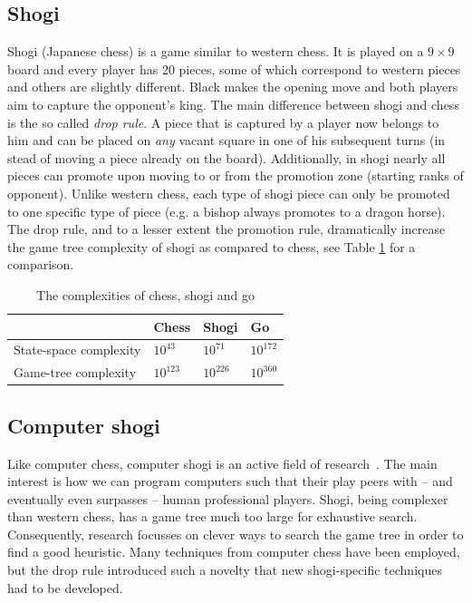 \documentclass{article}
\begin{document}
\subsection{Shogi}
Shogi (Japanese chess\cite{shogibook}) is a game similar to western chess. It is played on a $9 \times 9$ board and every
player has 20 pieces, some of which correspond to western pieces and others are slightly different.
Black makes the opening move and both players aim to capture the opponent's king.
The main difference between shogi and chess is the so called \emph{drop rule}.
A piece that is captured by a player now belongs to him and can be placed on \textit{any} vacant square in one of his subsequent turns
(in stead of moving a piece already on the board).
Additionally, in shogi nearly all pieces can promote upon moving to or from the promotion zone (starting ranks of opponent).
Unlike western chess, each type of shogi piece can only be promoted to one specific type of piece (e.g. a bishop always promotes to a dragon horse).
The drop rule, and to a lesser extent the promotion rule, dramatically increase the game tree complexity of shogi as compared to chess, see Table
\ref{table:complex} for a comparison.\\
\begin{table}
\center
\begin{tabular}{l l l l}
 & Chess & Shogi & Go \\ \hline
State-space complexity & $10^{43}$ & $10^{71}$ & $10^{172}$ \\
Game-tree complexity & $10^{123}$ & $10^{226}$ & $10^{360}$ \\ \hline
\end{tabular}
\caption{The complexities of chess, shogi and go}
\label{table:complex}
\end{table}

\subsection{Computer shogi}
Like computer chess, computer shogi is an active field of research~\cite{iida2002computer}. The main interest is how we can program computers 
such that their play peers with -- and eventually even surpasses -- human professional players. Shogi, being complexer
than western chess, has a game tree much too large for exhaustive search. Consequently, research
focusses on clever ways to search the game tree in order to find a good heuristic. Many techniques from computer chess
have been employed, but the drop rule introduced such a novelty that new shogi-specific techniques had to be developed.\\
\end{document}
